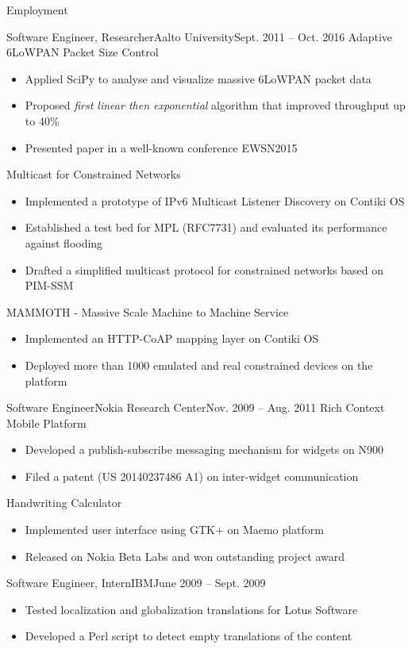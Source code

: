 \documentclass[print]{mcdowellcv}
\begin{document}
\begin{cvsection}{Employment}
		\begin{cvsubsection}{Software Engineer, Researcher}{Aalto University}{Sept. 2011 -- Oct. 2016}	
			Adaptive 6LoWPAN Packet Size Control
			\begin{itemize}
				\item Applied SciPy to analyse and visualize massive 6LoWPAN packet data
				\item Proposed \textit{first linear then exponential} algorithm that improved throughput up to 40\%
				\item Presented paper in a well-known conference EWSN2015
			\end{itemize}
			\smallskip
			Multicast for Constrained Networks
			\begin{itemize}
				\item Implemented a prototype of IPv6 Multicast Listener Discovery on Contiki OS
				\item Established a test bed for MPL (RFC7731) and evaluated its performance against flooding 
				\item Drafted a simplified multicast protocol for constrained networks based on PIM-SSM
			\end{itemize}
			\smallskip
			MAMMOTH - Massive Scale Machine to Machine Service
			\begin{itemize}
				\item Implemented an HTTP-CoAP mapping layer on Contiki OS
				\item Deployed more than 1000 emulated and real constrained devices on the platform
			\end{itemize}
		\end{cvsubsection}

		\begin{cvsubsection}{Software Engineer}{Nokia Research Center}{Nov. 2009 -- Aug. 2011}	
			Rich Context Mobile Platform
			\begin{itemize}
				\item Developed a publish-subscribe messaging mechanism for widgets on N900
				\item Filed a patent (US 20140237486 A1) on inter-widget communication
			\end{itemize}
			\smallskip
			Handwriting Calculator
			\begin{itemize}
				\item Implemented user interface using GTK+ on Maemo platform
				\item Released on Nokia Beta Labs and won outstanding project award
			\end{itemize}
		\end{cvsubsection}
		
		\begin{cvsubsection}{Software Engineer, Intern}{IBM}{June 2009 -- Sept. 2009}	
			\begin{itemize}
				\item Tested localization and globalization translations for Lotus Software
				\item Developed a Perl script to detect empty translations of the content
			\end{itemize}
		\end{cvsubsection}
	\end{cvsection}
\end{document}
